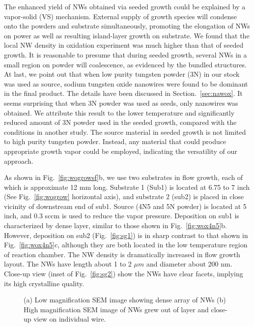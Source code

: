 The enhanced yield of NWs obtained via seeded growth could be explained by a vapor-solid (VS) mechanism. External supply of growth species will condense onto the powders and substrate simultaneously, promoting the elongation of NWs on power as well as resulting island-layer growth on substrate. We found that the local NW density in oxidation experiment was much higher than that of seeded growth. It is reasonable to presume that during seeded growth, several NWs in a small region on powder will coalescence, as evidenced by the bundled structures. At last, we point out that when low purity tungsten powder (3N) in our stock was used as source, sodium tungsten oxide nanowires were found to be dominant in the final product. The details have been discussed in Section.~\ref{sec:nawox}. It seems surprising that when 3N powder was used as seeds, only  nanowires was obtained. We attribute this result to the lower temperature and significantly reduced amount of 3N powder used in the seeded growth, compared with the conditions in another study. The source material in seeded growth is not limited to high purity tungsten powder. Instead, any material that could produce appropriate growth vapor could be employed, indicating the versatility of our approach.

As shown in Fig.~\ref{fig:wogrowsf}b, we use two substrates in flow growth, each of which is approximate 12 mm long. Substrate 1 (Sub1) is located at 6.75 to 7 inch (See Fig.~\ref{fig:wogrow} horizontal axis), and substrate 2 (sub2) is placed in close vicinity of downstream end of sub1. Source (4N5 and 5N powder) is located at 5 inch, and 0.3 sccm  is used to reduce the  vapor pressure. Deposition on sub1 is characterized by dense layer, similar to those shown in Fig.~\ref{fig:wox4n5}b. However, deposition on sub2 (Fig.~\ref{fig:sg1}) is in sharp contrast to that shown in Fig.~\ref{fig:wox4n5}c, although they are both located in the low temperature region of reaction chamber. The NW density is dramatically increased in flow growth layout. The NWs have length about 1 to 2 $\mu m$ and diameter about 200 nm. Close-up view (inset of Fig.~\ref{fig:sg2}) show the NWs have clear facets, implying its high crystalline quality.
\begin{figure}[htb]
\centering
{}\hspace{0.04\textwidth}
\caption[Characterization of flow growth : SEM]{ (a) Low magnification SEM image showing dense array of NWs (b) High magnification SEM image of NWs grew out of layer and close-up view on individual wire.}
\label{fig:fgsem}
\end{figure}

